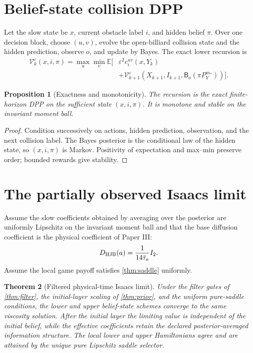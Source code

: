 \documentclass[11pt,reqno]{amsart}
\newtheorem{theorem}{Theorem}[section]
\newtheorem{proposition}[theorem]{Proposition}
\theoremstyle{definition}
\theoremstyle{remark}
\newcommand{\E}{\mathbb E}
\begin{document}
\section{Belief-state collision DPP}\label{sec:belief-dpp}

Let the slow state be $x$, current obstacle label $i$, and hidden belief
$\pi$.  Over one decision block, choose $(u,v)$, evolve the open-billiard
collision state and the hidden prediction, observe $o$, and update by Bayes.
The exact lower recursion is
\[
\begin{aligned}
 \mathcal V_k^\varepsilon(x,i,\pi)
 =
 \max_u\min_v
 \E\Big[
 &\varepsilon^2 c_i^{uv}(x,Y_k)\\
 &+\mathcal V_{k+1}^\varepsilon
 (X_{k+1},I_{k+1},\mathsf B_o(\pi P_Y^{m_*}))
 \Big].
\end{aligned}
\]

\begin{proposition}[Exactness and monotonicity]\label{prop:belief-dpp}
The recursion is the exact finite-horizon DPP on the sufficient state
$(x,i,\pi)$.  It is monotone and stable on the invariant moment ball.
\end{proposition}

\begin{proof}
Condition successively on actions, hidden prediction, observation, and the
next collision label.  The Bayes posterior is the conditional law of the
hidden state, so $(x,i,\pi)$ is Markov.  Positivity of expectation and
max--min preserve order; bounded rewards give stability.
\end{proof}

\section{The partially observed Isaacs limit}\label{sec:limit}

Assume the slow coefficients obtained by averaging over the posterior are
uniformly Lipschitz on the invariant moment ball and that the base diffusion
coefficient is the physical coefficient of Paper III:
\[
 D_{\rm HJB}(a)=\frac1{14\bar\tau_a}I_2.
\]
Assume the local game payoff satisfies \cref{thm:saddle} uniformly.

\begin{theorem}[Filtered physical-time Isaacs limit]\label{thm:filtered-limit}
Under the filter gates of \cref{thm:filter}, the initial-layer scaling of
\cref{thm:prior}, and the uniform pure-saddle conditions, the lower and upper
belief-state schemes converge to the same viscosity solution.  After the
initial layer the limiting value is independent of the initial belief, while
the effective coefficients retain the declared posterior-averaged information
structure.  The local lower and upper Hamiltonians agree and are attained by
the unique pure Lipschitz saddle selector.
\end{theorem}
\end{document}
